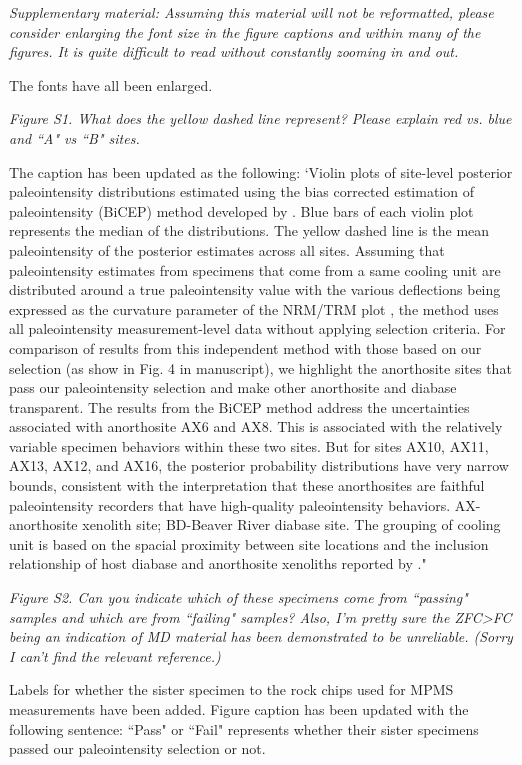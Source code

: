 \documentclass[11pt, letterpaper]{article}
\begin{document}
\begin{flushleft}
\textit{Supplementary material: Assuming this material will not be reformatted, please consider enlarging the font size in the figure captions and within many of the figures. It is quite difficult to read without constantly zooming in and out.}

The fonts have all been enlarged.

\textit{Figure S1. What does the yellow dashed line represent? Please explain red vs. blue and ``A" vs ``B" sites.}

The caption has been updated as the following: `Violin plots of site-level posterior paleointensity distributions estimated using the bias corrected estimation of paleointensity (BiCEP) method developed by \citealp{Cych2021a}. Blue bars of each violin plot represents the median of the distributions. The yellow dashed line is the mean paleointensity of the posterior estimates across all sites. Assuming that paleointensity estimates from specimens that come from a same cooling unit are distributed around a true paleointensity value with the various deflections being expressed as the curvature parameter of the NRM/TRM plot \cite{Arai1963a, Paterson2011a}, the method uses all paleointensity measurement-level data without applying selection criteria. For comparison of results from this independent method with those based on our selection (as show in Fig. 4 in manuscript), we highlight the anorthosite sites that pass our paleointensity selection and make other anorthosite and diabase transparent. The results from the BiCEP method address the uncertainties associated with anorthosite AX6 and AX8. This is associated with the relatively variable specimen behaviors within these two sites. But for sites AX10, AX11, AX13, AX12, and AX16, the posterior probability distributions have very narrow bounds, consistent with the interpretation that these anorthosites are faithful paleointensity recorders that have high-quality paleointensity behaviors. AX-anorthosite xenolith site; BD-Beaver River diabase site. The grouping of cooling unit is based on the spacial proximity between site locations and the inclusion relationship of host diabase and anorthosite xenoliths reported by \citealp{Zhang2021b}."

\textit{Figure S2. Can you indicate which of these specimens come from ``passing" samples and which are from ``failing" samples? Also, I'm pretty sure the ZFC>FC being an indication of MD material has been demonstrated to be unreliable. (Sorry I can't find the relevant reference.)}

Labels for whether the sister specimen to the rock chips used for MPMS measurements have been added. Figure caption has been updated with the following sentence: ``Pass" or ``Fail" represents whether their sister specimens passed our paleointensity selection or not. 


\end{flushleft}
\end{document}
